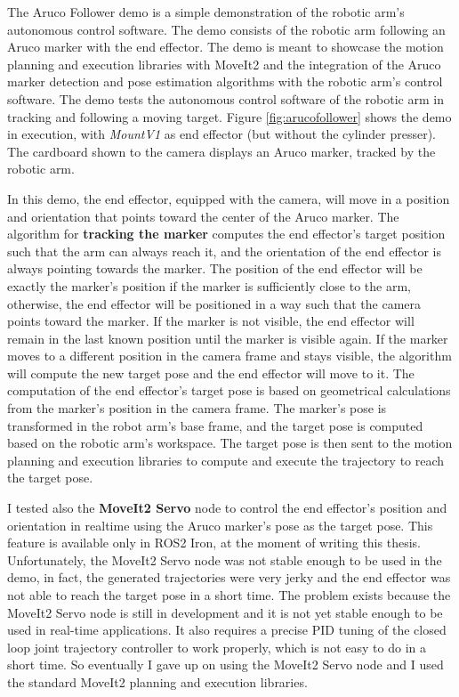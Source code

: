 The Aruco Follower demo is a simple demonstration of the robotic arm's autonomous control software. The demo
consists of the robotic arm following an Aruco marker with the end effector. The demo is meant to showcase the
motion planning and execution libraries with MoveIt2 and the integration of the Aruco marker detection 
and pose estimation algorithms with the robotic arm's control software.
The demo tests the autonomous control software of the robotic arm in tracking and following a moving target.
Figure \ref{fig:arucofollower} shows the demo in execution, with \textit{MountV1} as end effector (but without
the cylinder presser). The cardboard shown to the camera displays an Aruco marker, tracked by the robotic arm.

In this demo, the end effector,
equipped with the camera, will move in a position and orientation that points toward the center of the
Aruco marker. The algorithm for \textbf{tracking the marker} computes the end effector's target position such that
the arm can always reach it, and the orientation of the end effector is always pointing towards the marker.
The position of the end effector will be exactly the marker's position if the marker is sufficiently close to the arm,
otherwise, the end effector will be positioned in a way such that the camera points toward the marker.
If the marker is not visible, the end effector will remain in the last known position until the marker is
visible again. If the marker moves to a different position in the camera frame and stays visible,
the algorithm will compute the new target pose and the end effector will move to it.
The computation of the end effector's target pose is based on geometrical calculations from the marker's position
in the camera frame. The marker's pose is transformed in the robot arm's base frame, and the target pose is
computed based on the robotic arm's workspace. The target pose is then sent to the motion planning and execution
libraries to compute and execute the trajectory to reach the target pose.

I tested also the \textbf{MoveIt2 Servo} node to control the end effector's position and orientation in realtime
using the Aruco marker's pose as the target pose. This feature is available only in ROS2 Iron, at the moment
of writing this thesis. Unfortunately, the MoveIt2 Servo node was not stable enough to be used in the demo,
in fact, the generated trajectories were very jerky and the end effector was not able to reach the target
pose in a short time. The problem exists because the MoveIt2 Servo node is still in development
and it is not yet stable enough to be used in real-time applications. It also requires a precise PID tuning
of the closed loop joint trajectory controller to work properly, which is not easy to do in a short time.
So eventually I gave up on using the MoveIt2 Servo node and I used the standard MoveIt2 planning and execution
libraries.


